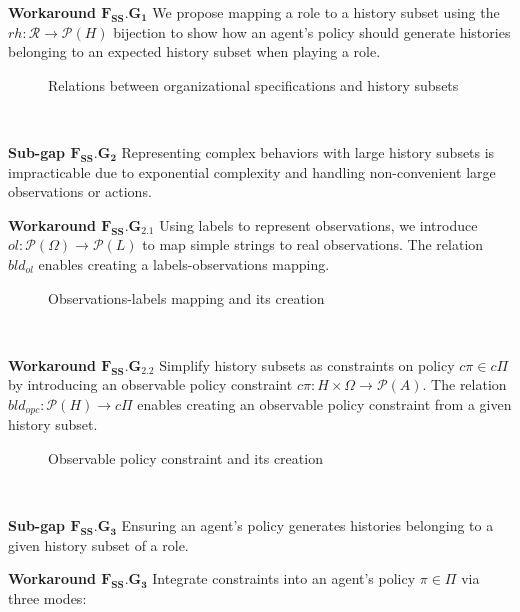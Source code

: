 \documentclass[conference]{IEEEtran}
\newcounter{relation}
\begin{document}
\textbf{Workaround $\mathbf{F_{SS}.G_1}$} \quad We propose mapping a role to a history subset using the $rh: \mathcal{R} \rightarrow \mathcal{P}(H)$ bijection to show how an agent's policy should generate histories belonging to an expected history subset when playing a role.

\begin{figure}[h!]
    \centering
    
    \caption{Relations between organizational specifications and history subsets}
    \label{fig:PRAHOM_osm_rels}
\end{figure}

\

\textbf{Sub-gap $\mathbf{F_{SS}.G_2}$} \quad Representing complex behaviors with large history subsets is impracticable due to exponential complexity and handling non-convenient large observations or actions.

\textbf{Workaround $\mathbf{F_{SS}.G_{2.1}}$} \quad Using labels to represent observations, we introduce $ol: \mathcal{P}(\Omega) \rightarrow \mathcal{P}(L)$ to map simple strings to real observations. The relation $bld_{ol}$ enables creating a labels-observations mapping.

\begin{figure}[h!]
    \centering
    
    \caption{Observations-labels mapping and its creation}
    \label{fig:PRAHOM_ol}
\end{figure}

\

\textbf{Workaround $\mathbf{F_{SS}.G_{2.2}}$} \quad Simplify history subsets as constraints on policy $c\pi \in c\Pi$ by introducing an observable policy constraint $c\pi: H \times \Omega \rightarrow \mathcal{P}(A)$. The relation $bld_{opc}: \mathcal{P}(H) \rightarrow c\Pi$ enables creating an observable policy constraint from a given history subset.

\begin{figure}[h!]
    \centering
    
    \caption{Observable policy constraint and its creation}
    \label{fig:PRAHOM_opc}
\end{figure}

\

\textbf{Sub-gap $\mathbf{F_{SS}.G_3}$} \quad Ensuring an agent's policy generates histories belonging to a given history subset of a role.

\textbf{Workaround $\mathbf{F_{SS}.G_3}$} \quad Integrate constraints into an agent's policy $\pi \in \Pi$ via three modes:
\end{document}
